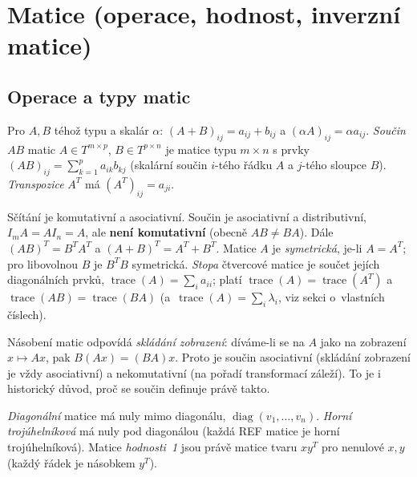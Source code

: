 \documentclass[11pt,a4paper]{article}
\newcommand{\tr}{\operatorname{trace}}
\begin{document}
\section{Matice (operace, hodnost, inverzní matice)}

\subsection{Operace a typy matic}

\begin{definice}
Pro $A,B$ téhož typu a skalár $\alpha$: $(A+B)_{ij}=a_{ij}+b_{ij}$ a $(\alpha A)_{ij}=\alpha a_{ij}$. \emph{Součin} $AB$ matic $A\in T^{m\times p}$, $B\in T^{p\times n}$ je matice typu $m\times n$ s prvky $(AB)_{ij}=\sum_{k=1}^{p}a_{ik}b_{kj}$ (skalární součin $i$-tého řádku $A$ a $j$-tého sloupce $B$). \emph{Transpozice} $A^T$ má $(A^T)_{ij}=a_{ji}$.
\end{definice}

\begin{poznamka}[Vlastnosti]
Sčítání je komutativní a asociativní. Součin je asociativní a distributivní, $I_mA=AI_n=A$, ale \textbf{není komutativní} (obecně $AB\neq BA$). Dále $(AB)^T=B^TA^T$ a $(A+B)^T=A^T+B^T$. Matice $A$ je \emph{symetrická}, je-li $A=A^T$; pro libovolnou $B$ je $B^TB$ symetrická. \emph{Stopa} čtvercové matice je součet jejích diagonálních prvků, $\tr(A)=\sum_i a_{ii}$; platí $\tr(A)=\tr(A^T)$ a~$\tr(AB)=\tr(BA)$ (a~$\tr(A)=\sum_i\lambda_i$, viz sekci o~vlastních číslech).
\end{poznamka}

\begin{intuice}
Násobení matic odpovídá \emph{skládání zobrazení}: díváme-li se na $A$ jako na zobrazení $x\mapsto Ax$, pak $B(Ax)=(BA)x$. Proto je součin asociativní (skládání zobrazení je vždy asociativní) a nekomutativní (na pořadí transformací záleží). To je i historický důvod, proč se součin definuje právě takto.
\end{intuice}

\begin{poznamka}
\emph{Diagonální} matice má nuly mimo diagonálu, $\operatorname{diag}(v_1,\dots,v_n)$. \emph{Horní trojúhelníková} má nuly pod diagonálou (každá REF matice je horní trojúhelníková). Matice \emph{hodnosti~1} jsou právě matice tvaru $xy^T$ pro nenulové $x,y$ (každý řádek je násobkem $y^T$).
\end{poznamka}
\end{document}
